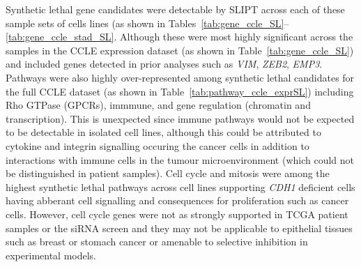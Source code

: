 Synthetic lethal gene candidates were detectable by \gls{SLIPT} across each of these sample sets of cells lines (as shown in Tables~\ref{tab:gene_ccle_SL}\nobreakdash--\ref{tab:gene_ccle_stad_SL}. Although these were most highly significant across the samples in the CCLE expression dataset (as shown in Table~\ref{tab:gene_ccle_SL}) and included genes detected in prior analyses such as \textit{VIM}, \textit{ZEB2}, \textit{EMP3}. Pathways were also highly over-represented among synthetic lethal candidates for the full CCLE dataset (as shown in Table~\ref{tab:pathway_ccle_exprSL}) including Rho GTPase (GPCRs), immmune, and gene regulation (chromatin and transcription). This is unexpected since immune pathways would not be expected to be detectable in isolated cell lines, although this could be attributed to cytokine and integrin signalling occuring the cancer cells in addition to interactions with immune cells in the tumour microenvironment (which could not be distinguished in patient samples). Cell cycle and mitosis were among the highest synthetic lethal pathways across cell lines supporting \textit{CDH1} deficient cells having abberant cell signalling and consequences for proliferation such as cancer cells. However, cell cycle genes were not as strongly supported in TCGA patient samples or the siRNA screen \citep{Telford2015} and they may not be applicable to epithelial tissues such as breast or stomach cancer or amenable to selective inhibition in experimental models.   

